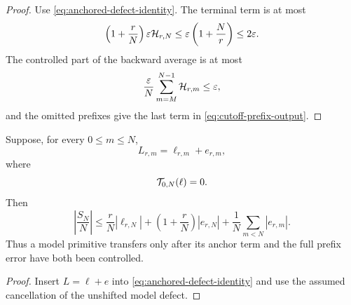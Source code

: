 \begin{proof}
Use \cref{eq:anchored-defect-identity}.  The terminal term is at
most
\[
 \left(1+\frac rN\right)\varepsilon\mathcal H_{r,N}
 \le
 \varepsilon\left(1+\frac Nr\right)
 \le2\varepsilon.
\]
The controlled part of the backward average is at most
\[
 \frac{\varepsilon}{N}
 \sum_{m=M}^{N-1}\mathcal H_{r,m}
 \le\varepsilon,
\]
and the omitted prefixes give the last term in
\eqref{eq:cutoff-prefix-output}.
\end{proof}

\begin{proposition}
\label{prop:smooth-terminal}
Suppose, for every \(0\le m\le N\),
\[
 L_{r,m}=\ell_{r,m}+e_{r,m},
\]
where
\[
 \mathcal T_{0,N}(\ell)=0.
\]
Then
\[
 \left|\frac{S_N}{N}\right|
 \le
 \frac rN|\ell_{r,N}|
 +\left(1+\frac rN\right)|e_{r,N}|
 +\frac1N\sum_{m<N}|e_{r,m}|.
\]
Thus a model primitive transfers only after its anchor term and the
full prefix error have both been controlled.
\end{proposition}

\begin{proof}
Insert \(L=\ell+e\) into
\eqref{eq:anchored-defect-identity} and use the assumed cancellation
of the unshifted model defect.
\end{proof}
